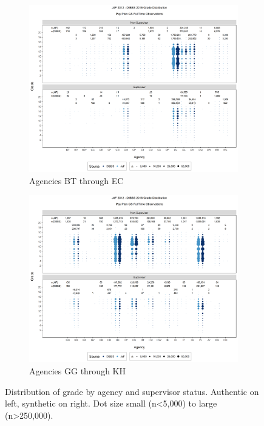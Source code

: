 \documentclass[10pt, letterpaper]{article}
\begin{document}
\begin{spacing}{1.0}
\clearpage

\begin{figure}[]
    \centering
    \begin{subfigure}{1\textwidth}
        \centering
        \includegraphics[width=6in, trim={0 0.55in 0 0.75in}, clip]{JdFDIBBSGSFullTimeGradeSupervisoryStatusAgency21.png}
        \caption{Agencies BT through EC}
        \vspace{10pt}
    \end{subfigure}
    \begin{subfigure}{1\textwidth}
        \centering
        \includegraphics[width=6in, trim={0 0.55in 0 0.75in}, clip]{JdFDIBBSGSFullTimeGradeSupervisoryStatusAgency61.png}
        \caption{Agencies GG through KH}
    \end{subfigure}
    \caption{Distribution of grade by agency and supervisor status.  Authentic on left, synthetic on right.  Dot size small (n<5,000) to large (n>250,000).}
    \label{figure:JdFDIBBSGSFullTimeGradeSupervisoryStatusAgency}
\end{figure}


\end{spacing}
\end{document}
